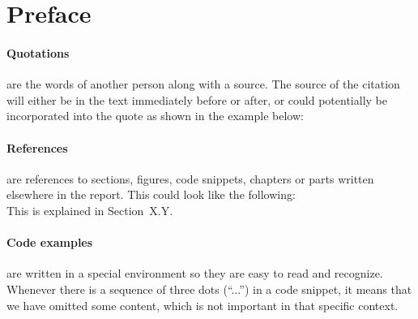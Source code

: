 
\begingroup
\let\clearpage\relax
\let\cleardoublepage\relax
\let\cleardoublepage\relax

\section*{Preface} %






\paragraph{Quotations} are the words of another person along with a source.
The source of the citation will either be in the text immediately before or after, or could potentially be incorporated into the quote as shown in the example below: \\


\paragraph{References} are references to sections, figures, code snippets, chapters or parts written elsewhere in the report. 
This could look like the following:\\

This is explained in Section~X.Y.

\paragraph{Code examples} are written in a special environment so they are easy to read and recognize. 
Whenever there is a sequence of three dots (``...'') in a code snippet, it means that we have omitted some content, which is not important in that specific context.

%



\endgroup			

\vfill
